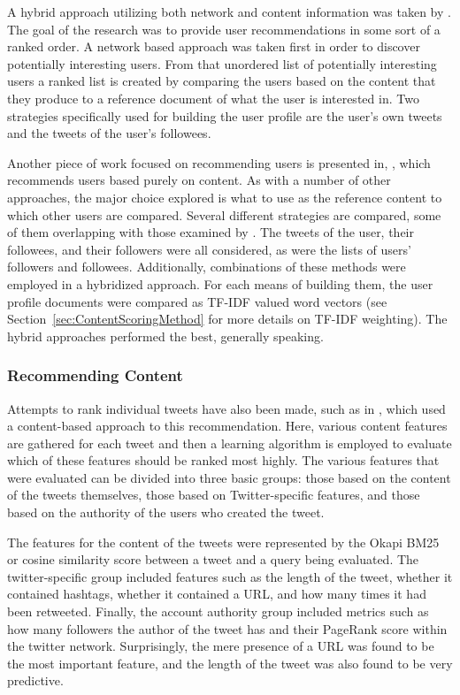 A hybrid approach utilizing both network and content information was taken by \cite{Armentano2011}. The goal of the research was to provide user recommendations in some sort of a ranked order. A network based approach was taken first in order to  discover potentially interesting users. From that unordered list of potentially interesting users a ranked list is created by comparing the users based on the content that they produce to a reference document of what the user is interested in. Two strategies specifically used for building the user profile are the user's own tweets and the tweets of the user's followees.

Another piece of work focused on recommending users is presented in, \cite{Hannon2010}, which recommends users based purely on content. As with a number of other approaches, the major choice explored is what to use as the reference content to which other users are compared. Several different strategies are compared, some of them overlapping with those examined by \cite{Armentano2011}. The tweets of the user, their followees, and their followers were all considered, as were the lists of users' followers and followees. Additionally, combinations of these methods were employed in a hybridized approach. For each means of building them, the user profile documents were compared as TF-IDF valued word vectors (see Section~\ref{sec:ContentScoringMethod} for more details on TF-IDF weighting). The hybrid approaches performed the best, generally speaking. 

\subsubsection{Recommending Content}

Attempts to rank individual tweets have also been made, such as in \cite{Duan2010}, which used a content-based approach to this recommendation. Here, various content features are gathered for each tweet and then a learning algorithm is employed to evaluate which of these features should be ranked most highly. The various features that were evaluated can be divided into three basic groups: those based on the content of the tweets themselves, those based on Twitter-specific features, and those based on the authority of the users who created the tweet.

The features for the content of the tweets were represented by the Okapi BM25 or cosine similarity score between a tweet and a query being evaluated. The twitter-specific group included features such as the length of the tweet, whether it contained hashtags, whether it contained a URL, and how many times it had been retweeted. Finally, the account authority group included metrics such as how many followers the author of the tweet has and their PageRank score within the twitter network. Surprisingly, the mere presence of a URL was found to be the most important feature, and the length of the tweet was also found to be very predictive.

